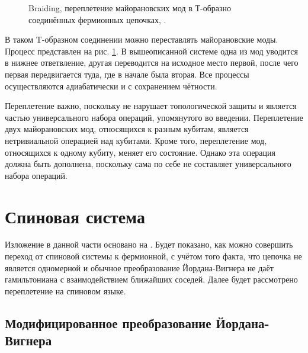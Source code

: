 \documentclass[a4paper,12pt]{article}
\theoremstyle{plain} %
\theoremstyle{definition} %
\theoremstyle{remark} %
\begin{document}
\begin{figure}
    \centering
    \caption{Braiding, переплетение майорановских мод в Т-образно соединённых фермионных цепочках, \cite{braiding}.}
    \label{fig:braiding}
\end{figure}

В таком T-\hspace{0pt}образном соединении можно переставлять майорановские моды. Процесс представлен на рис. \ref{fig:braiding}. В вышеописанной системе одна из мод уводится в нижнее ответвление, другая переводится на исходное место первой, после чего первая передвигается туда, где в начале была вторая. Все процессы осуществляются адиабатически и с сохранением чётности.

Переплетение важно, поскольку не нарушает топологической защиты и является частью универсального набора операций, упомянутого во введении. Переплетение двух майорановских мод, относящихся к разным кубитам, является нетривиальной операцией над кубитами. Кроме того, переплетение мод, относящихся к одному кубиту, меняет его состояние. Однако эта операция должна быть дополнена, поскольку сама по себе не составляет универсального набора операций.


\pagebreak

\section{Спиновая система} \label{sec:spin_system}

Изложение в данной части основано на \cite{main}. Будет показано, как можно совершить переход от спиновой системы к фермионной, с учётом того факта, что цепочка не является одномерной и обычное преобразование Йордана-Вигнера не даёт гамильтониана с взаимодействием ближайших соседей. Далее будет рассмотрено переплетение на спиновом языке.

\subsection{Модифицированное преобразование Йордана-Вигнера} \label{subsec:jordan}
\end{document}
